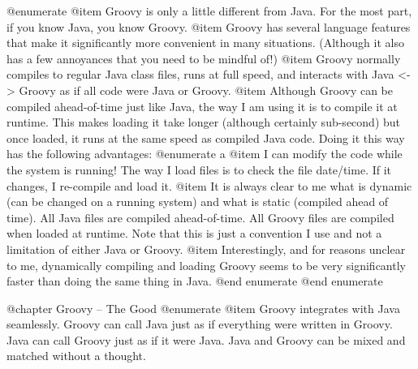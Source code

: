 @enumerate
@item
Groovy is only a little different from Java.  For the most part, if
you know Java, you know Groovy.
@item
Groovy has several language features that make it significantly
more convenient in many situations.  (Although it also has a few
annoyances that you need to be mindful of!)
@item
Groovy normally compiles to regular Java class files, runs at full
speed, and interacts with Java <-> Groovy as if all code were Java or
Groovy.
@item
Although Groovy can be compiled ahead-of-time just like Java, the
way I am using it is to compile it at runtime.  This makes loading
it take longer (although certainly sub-second) but once loaded, it
runs at the same speed as compiled Java code.  Doing it this way
has the following advantages:
@enumerate a
@item
I can modify the code while the system is running!  The way I
load files is to check the file date/time.  If it changes, I
re-compile and load it.
@item
It is always clear to me what is dynamic (can be changed on a
running system) and what is static (compiled ahead of time).
All Java files are compiled ahead-of-time.  All Groovy files
are compiled when loaded at runtime.  Note that this is just a
convention I use and not a limitation of either Java or Groovy.
@item
Interestingly, and for reasons unclear to me, dynamically
compiling and loading Groovy seems to be very significantly
faster than doing the same thing in Java.
@end enumerate
@end enumerate

@chapter Groovy -- The Good
@enumerate
@item
Groovy integrates with Java seamlessly.  Groovy can call Java just
as if everything were written in Groovy.  Java can call Groovy just
as if it were Java.  Java and Groovy can be mixed and matched
without a thought.
   
